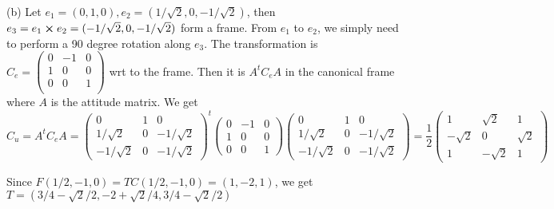 \documentclass[12pt]{article}
\begin{document}
(b)
Let $e_1 = (0, 1, 0),  e_2 = (1/\sqrt{2}, 0, - 1/\sqrt{2})$, then $e_3 = e_1 \cross e_2 = (-1/\sqrt{2}, 0, -1/\sqrt{2})$ form a frame. From $e_1$ to $e_2$, we simply need to perform a 90 degree rotation along $e_3$. The transformation is  $C_e = \begin{pmatrix}
	0 & -1 & 0 \\ 
	1 & 0 & 0 \\
	0 & 0 & 1 \\
\end{pmatrix}$ wrt to the frame. Then it is $A^t C_e A$ in the canonical frame where $A$ is the attitude matrix. We get 
$$
  C_u = A^t C_e A = \begin{pmatrix}
  	0 & 1 & 0 \\
  	1/\sqrt{2} & 0 & -1/\sqrt{2} \\
  	-1/\sqrt{2} & 0 & -1/\sqrt{2} 
  \end{pmatrix}^t
\begin{pmatrix}
	0 & -1 & 0 \\
	1 &  0 & 0 \\
	0 &  0 & 1
\end{pmatrix}
\begin{pmatrix}
	0 & 1 & 0 \\
	1/\sqrt{2} & 0 & -1/\sqrt{2} \\
	-1/\sqrt{2} & 0 & -1/\sqrt{2} 
\end{pmatrix}
= \frac{1}{2} \begin{pmatrix}
	1 & \sqrt{2} & 1 \\- \sqrt{2} & 0  & \sqrt{2} \\ 1 & - \sqrt{2} & 1 
\end{pmatrix}
$$

Since $F(1/2, -1, 0) = TC(1/2, -1, 0) = (1, -2, 1)$, we get $T = (3/4 - \sqrt{2}/2, -2 + \sqrt{2}/4 , 3/4 - \sqrt{2}/ 2) $
\end{document}

